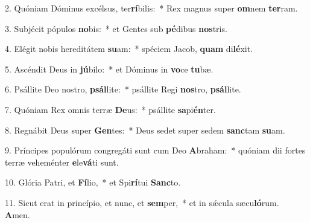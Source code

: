2. Quóniam Dóminus excélsus, ter\textbf{rí}bilis:~*  Rex magnus super \textbf{om}nem \textbf{ter}ram.\

3. Subjécit pópulos \textbf{no}bis:~*  et Gentes sub \textbf{pé}dibus \textbf{nos}tris.\

4. Elégit nobis hereditátem \textbf{su}am:~*  spéciem Jacob, \textbf{quam} di\textbf{lé}xit.\

5. Ascéndit Deus in \textbf{jú}bilo:~*  et Dóminus in \textbf{vo}ce \textbf{tu}bæ.\

6. Psállite Deo nostro, \textbf{psál}lite:~*  psállite Regi \textbf{nos}tro, \textbf{psál}lite.\

7. Quóniam Rex omnis terræ \textbf{De}us:~*  psállite \textbf{sa}pi\textbf{én}ter.\

8. Regnábit Deus super \textbf{Gen}tes:~*  Deus sedet super sedem \textbf{sanc}tam \textbf{su}am.\

9. Príncipes populórum congregáti sunt cum Deo \textbf{A}braham:~*  quóniam dii fortes terræ veheménter \textbf{e}le\textbf{vá}ti sunt.\

10. Glória Patri, et \textbf{Fí}lio,~*  et Spi\textbf{rí}tui \textbf{Sanc}to.\

11. Sicut erat in princípio, et nunc, et \textbf{sem}per,~*  et in sǽcula sæcu\textbf{ló}rum. \textbf{A}men.\

